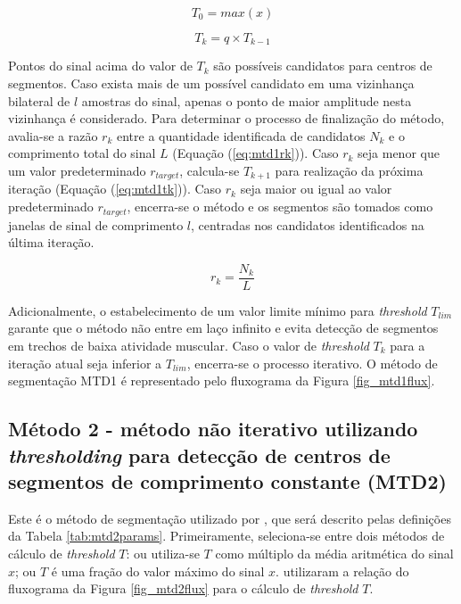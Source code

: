 \begin{equation}
	\label{eq:mtd1t0}
	T_0 = max(x)
\end{equation}

\begin{equation}
	\label{eq:mtd1tk}
	T_k = q \times T_{k-1}
\end{equation}

Pontos do sinal acima do valor de $T_k$ são possíveis candidatos para centros de segmentos. Caso exista mais de um possível candidato em uma vizinhança bilateral de $l$ amostras do sinal, apenas o ponto de maior amplitude nesta vizinhança é considerado. Para determinar o processo de finalização do método, avalia-se a razão $r_k$ entre a quantidade identificada de candidatos $N_{k}$ e o comprimento total do sinal $L$ (Equação (\ref{eq:mtd1rk})). Caso $r_k$ seja menor que um valor predeterminado $r_{target}$, calcula-se $T_{k+1}$ para realização da próxima iteração (Equação (\ref{eq:mtd1tk})). Caso $r_k$ seja maior ou igual ao valor predeterminado $r_{target}$, encerra-se o método e os segmentos são tomados como janelas de sinal de comprimento $l$, centradas nos candidatos identificados na última iteração.

\begin{equation}
	\label{eq:mtd1rk}
	r_k = \frac{N_{k}}{L} 
\end{equation}

Adicionalmente, o estabelecimento de um valor limite mínimo para \emph{threshold} $T_{lim}$ garante que o método não entre em laço infinito e evita detecção de segmentos em trechos de baixa atividade muscular. Caso o valor de \emph{threshold} $T_k$ para a iteração atual seja inferior a $T_{lim}$, encerra-se o processo iterativo. O método de segmentação MTD1 é representado pelo fluxograma da Figura \ref{fig_mtd1flux}.



			\subsection{Método 2 - método não iterativo utilizando \emph{thresholding} para detecção de centros de segmentos de comprimento constante (MTD2)}
Este é o método de segmentação utilizado por , que será descrito pelas definições da Tabela \ref{tab:mtd2params}. Primeiramente, seleciona-se entre dois métodos de cálculo de \emph{threshold} $T$: ou utiliza-se $T$ como múltiplo da média aritmética do sinal $x$; ou $T$ é uma fração do valor máximo do sinal $x$.  utilizaram a relação do fluxograma da Figura \ref{fig_mtd2flux} para o cálculo de \emph{threshold} $T$.

